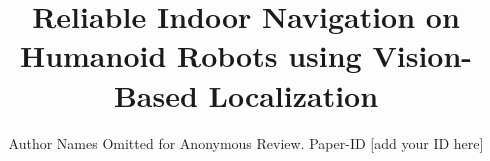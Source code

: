 \documentclass[conference]{IEEEtran}
\begin{document}
\title{Reliable Indoor Navigation on Humanoid Robots using
  Vision-Based Localization}

\author{Author Names Omitted for Anonymous Review. Paper-ID [add your ID here]}





%

\end{document}

